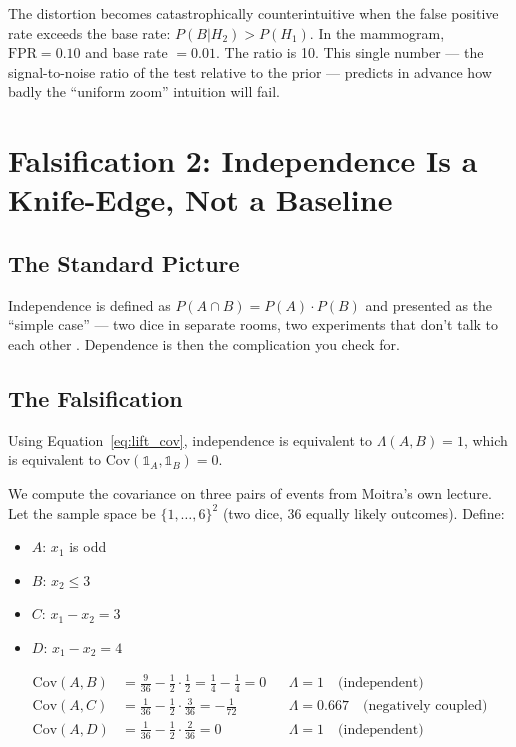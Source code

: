 \documentclass[12pt]{article}
\begin{document}
The distortion becomes catastrophically counterintuitive when the false positive rate exceeds the base rate: $P(B|H_2) > P(H_1)$. In the mammogram, $\text{FPR} = 0.10$ and base rate $= 0.01$. The ratio is 10. This single number --- the signal-to-noise ratio of the test relative to the prior --- predicts in advance how badly the ``uniform zoom'' intuition will fail.

\section{Falsification 2: Independence Is a Knife-Edge, Not a Baseline}

\subsection{The Standard Picture}

Independence is defined as $P(A \cap B) = P(A) \cdot P(B)$ and presented as the ``simple case'' --- two dice in separate rooms, two experiments that don't talk to each other \cite{moitra2024}. Dependence is then the complication you check for.

\subsection{The Falsification}

Using Equation~\ref{eq:lift_cov}, independence is equivalent to $\Lambda(A,B) = 1$, which is equivalent to $\mathrm{Cov}(\mathbb{1}_A, \mathbb{1}_B) = 0$.

We compute the covariance on three pairs of events from Moitra's own lecture. Let the sample space be $\{1,\ldots,6\}^2$ (two dice, 36 equally likely outcomes). Define:
\begin{itemize}[nosep]
\item $A$: $x_1$ is odd
\item $B$: $x_2 \leq 3$
\item $C$: $x_1 - x_2 = 3$
\item $D$: $x_1 - x_2 = 4$
\end{itemize}

\begin{align}
\mathrm{Cov}(A,B) &= \tfrac{9}{36} - \tfrac{1}{2} \cdot \tfrac{1}{2} = \tfrac{1}{4} - \tfrac{1}{4} = 0 && \Lambda = 1 \quad \text{(independent)} \\[4pt]
\mathrm{Cov}(A,C) &= \frac{1}{36} - \frac{1}{2} \cdot \frac{3}{36} = -\frac{1}{72} && \Lambda = 0.667 \quad \text{(negatively coupled)} \\[4pt]
\mathrm{Cov}(A,D) &= \frac{1}{36} - \frac{1}{2} \cdot \frac{2}{36} = 0 && \Lambda = 1 \quad \text{(independent)}
\end{align}
\end{document}
